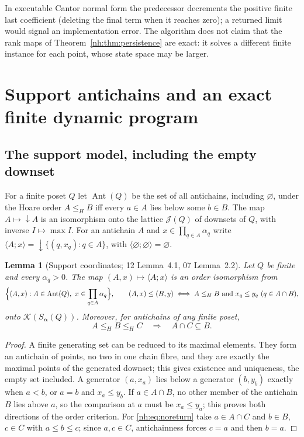 \documentclass[11pt,a4paper]{article}
\newtheorem{lemma}[theorem]{Lemma}
\theoremstyle{definition}
\theoremstyle{remark}
\newcommand{\K}{\mathcal K}
\newcommand{\J}{\mathcal J}
\newcommand{\Ant}{\operatorname{Ant}}
\begin{document}
In executable Cantor normal form the predecessor decrements the positive
finite last coefficient (deleting the final term when it reaches zero); a
returned limit would signal an implementation error. The algorithm does not
claim that the rank maps of Theorem~\ref{nh:thm:persistence} are exact: it
solves a different finite instance for each point, whose state space may be
larger.
\section{Support antichains and an exact finite dynamic program}
\label{nh:sec:dag}

\subsection{The support model, including the empty downset}

For a finite poset $Q$ let $\Ant(Q)$ be the set of all antichains, including
$\varnothing$, under the Hoare order $A\le_HB$ iff every $a\in A$ lies below
some $b\in B$. The map $A\mapsto{\downarrow}A$ is an isomorphism onto the
lattice $\J(Q)$ of downsets of $Q$, with inverse $I\mapsto\max I$. For an
antichain $A$ and $x\in\prod_{q\in A}\alpha_q$ write
$\langle A;x\rangle={\downarrow}\{(q,x_q):q\in A\}$, with
$\langle\varnothing;\varnothing\rangle=\varnothing$.

\begin{lemma}[Support coordinates; 12 Lemma~4.1, 07 Lemma~2.2]
\label{nh:lem:support}
Let $Q$ be finite and every $\alpha_q>0$. The map $(A,x)\mapsto\langle A;x\rangle$
is an order isomorphism from
\begin{equation}\label{nh:eq:supportmodel}
 \Bigl\{(A,x):A\in\Ant(Q),\ x\in\prod_{q\in A}\alpha_q\Bigr\},
 \qquad (A,x)\le(B,y)\iff A\le_HB\ \text{and}\ x_q\le y_q\ (q\in A\cap B),
\end{equation}
onto $\K(S_{\boldsymbol\alpha}(Q))$. Moreover, for antichains of any finite
poset,
\begin{equation}\label{nh:eq:noreturn}
 A\le_HB\le_HC\quad\Longrightarrow\quad A\cap C\subseteq B .
\end{equation}
\end{lemma}
\begin{proof}
A finite generating set can be reduced to its maximal elements. They form an
antichain of points, no two in one chain fibre, and they are exactly the
maximal points of the generated downset; this gives existence and uniqueness,
the empty set included. A generator $(a,x_a)$ lies below a generator
$(b,y_b)$ exactly when $a<b$, or $a=b$ and $x_a\le y_b$. If $a\in A\cap B$, no
other member of the antichain $B$ lies above $a$, so the comparison at $a$ must
be $x_a\le y_a$; this proves both directions of the order criterion. For
\eqref{nh:eq:noreturn} take $a\in A\cap C$ and $b\in B$, $c\in C$ with
$a\le b\le c$; since $a,c\in C$, antichainness forces $c=a$ and then $b=a$.
\end{proof}
\end{document}
